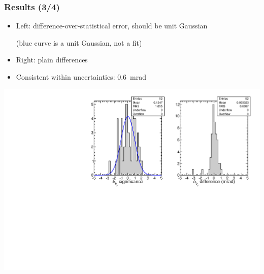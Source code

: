 \documentclass[compress]{beamer}
\begin{document}
\begin{frame}
\frametitle{Results (3/4)}
\begin{itemize}
\item Left: difference-over-statistical error, should be unit Gaussian

(blue curve is a unit Gaussian, not a fit)

\item Right: plain differences

\item Consistent within uncertainties: 0.6~mrad
\end{itemize}

\includegraphics[width=\linewidth]{afterincident_phiy.pdf}
\end{frame}
\end{document}
